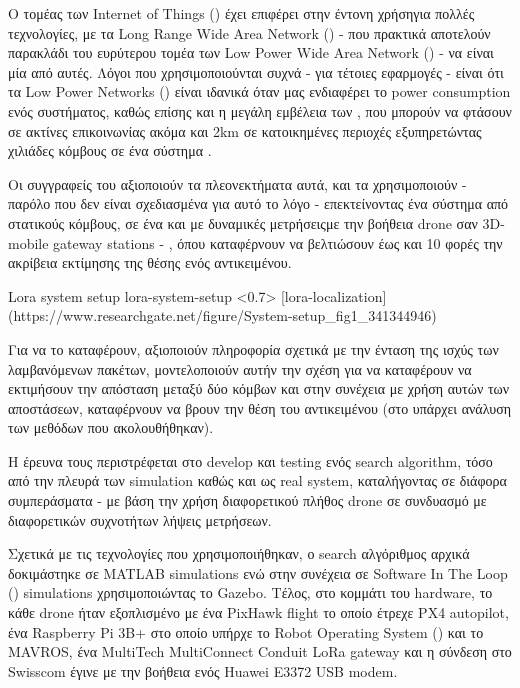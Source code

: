 Ο τομέας των Internet of Things () έχει επιφέρει στην έντονη χρήση\udot για πολλές τεχνολογίες, με τα Long Range Wide Area Network () - που πρακτικά αποτελούν παρακλάδι του ευρύτερου τομέα των Low Power Wide Area Network () - να είναι μία από αυτές. Λόγοι που χρησιμοποιούνται συχνά - για τέτοιες εφαρμογές - είναι ότι τα Low Power Networks () είναι ιδανικά όταν μας ε\-νδια\-φέ\-ρει το 
power consumption ενός συστήματος, καθώς επίσης και η μεγάλη εμβέλεια των , που μπορούν να φτάσουν σε ακτίνες επικοινωνίας ακόμα και 2km σε κατοικημένες περιοχές εξυπηρετώντας χιλιάδες κόμβους σε ένα σύστημα \cite{lora-localization}.

Οι συγγραφείς του \cite{lora-localization} αξιοποιούν τα πλεονεκτήματα αυτά,
και τα χρησιμοποιούν - παρόλο που δεν είναι σχεδιασμένα για αυτό το λόγο - επεκτείνοντας ένα σύστημα από στατικούς κόμβους, σε ένα και με δυναμικές μετρήσεις\udot με την βοήθεια drone σαν 3D-mobile gateway stations - , όπου καταφέρνουν να βελτιώσουν έως και 10 φορές την ακρίβεια εκτίμησης της θέσης ενός αντικειμένου.

%
{Lora system setup}%
{lora-system-setup}%
<0.7>%
[lora-localization](https://www.researchgate.net/figure/System-setup_fig1_341344946)

Για να το καταφέρουν, αξιοποιούν πληροφορία σχετικά με την ένταση της ισχύς των λαμβανόμενων πακέτων, μοντελοποιούν αυτήν την σχέση για να καταφέρουν να εκτιμήσουν την απόσταση μεταξύ δύο κόμβων και στην συνέχεια με χρήση αυτών των αποστάσεων, καταφέρνουν να 
βρουν την θέση του αντικειμένου (στο  υπάρχει ανάλυση των μεθόδων που ακολουθήθηκαν).

Η έρευνα τους περιστρέφεται στο develop και testing ενός search algorithm, τόσο από την πλευρά των simulation καθώς και ως real system, καταλήγοντας σε διάφορα συμπεράσματα - με βάση την χρήση διαφορετικού πλήθος drone σε συνδυασμό με διαφορετικών συχνοτήτων λήψεις μετρήσεων.

Σχετικά με τις τεχνολογίες που χρησιμοποιήθηκαν, ο search αλγόριθμος αρχικά δοκιμάστηκε σε 
MATLAB simulations ενώ στην συνέχεια σε Software In The Loop () simulations χρησιμοποιώντας 
το Gazebo. Τέλος, στο κομμάτι του hardware, το κάθε drone ήταν εξοπλισμένο με ένα PixHawk flight το οποίο έτρεχε PX4 autopilot, ένα Raspberry Pi 3B+ στο οποίο υπήρχε το Robot Operating System () και το MAVROS, ένα MultiTech MultiConnect Conduit LoRa gateway και η σύνδεση στο Swisscom  έγινε με την βοήθεια ενός Huawei E3372 USB modem.

